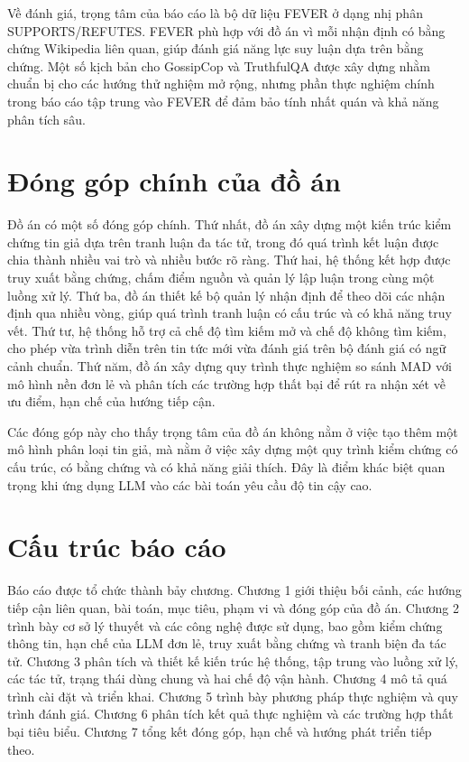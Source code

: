 ﻿\documentclass[oneside,a4paper,12pt]{extreport}
\begin{document}
Về đánh giá, trọng tâm của báo cáo là bộ dữ liệu FEVER ở dạng nhị phân SUPPORTS/REFUTES. FEVER phù hợp với đồ án vì mỗi nhận định có bằng chứng Wikipedia liên quan, giúp đánh giá năng lực suy luận dựa trên bằng chứng. Một số kịch bản cho GossipCop và TruthfulQA được xây dựng nhằm chuẩn bị cho các hướng thử nghiệm mở rộng, nhưng phần thực nghiệm chính trong báo cáo tập trung vào FEVER để đảm bảo tính nhất quán và khả năng phân tích sâu.

\section{Đóng góp chính của đồ án}

Đồ án có một số đóng góp chính. Thứ nhất, đồ án xây dựng một kiến trúc kiểm chứng tin giả dựa trên tranh luận đa tác tử, trong đó quá trình kết luận được chia thành nhiều vai trò và nhiều bước rõ ràng. Thứ hai, hệ thống kết hợp được truy xuất bằng chứng, chấm điểm nguồn và quản lý lập luận trong cùng một luồng xử lý. Thứ ba, đồ án thiết kế bộ quản lý nhận định để theo dõi các nhận định qua nhiều vòng, giúp quá trình tranh luận có cấu trúc và có khả năng truy vết. Thứ tư, hệ thống hỗ trợ cả chế độ tìm kiếm mở và chế độ không tìm kiếm, cho phép vừa trình diễn trên tin tức mới vừa đánh giá trên bộ đánh giá có ngữ cảnh chuẩn. Thứ năm, đồ án xây dựng quy trình thực nghiệm so sánh MAD với mô hình nền đơn lẻ và phân tích các trường hợp thất bại để rút ra nhận xét về ưu điểm, hạn chế của hướng tiếp cận.

Các đóng góp này cho thấy trọng tâm của đồ án không nằm ở việc tạo thêm một mô hình phân loại tin giả, mà nằm ở việc xây dựng một quy trình kiểm chứng có cấu trúc, có bằng chứng và có khả năng giải thích. Đây là điểm khác biệt quan trọng khi ứng dụng LLM vào các bài toán yêu cầu độ tin cậy cao.

\section{Cấu trúc báo cáo}

Báo cáo được tổ chức thành bảy chương. Chương 1 giới thiệu bối cảnh, các hướng tiếp cận liên quan, bài toán, mục tiêu, phạm vi và đóng góp của đồ án. Chương 2 trình bày cơ sở lý thuyết và các công nghệ được sử dụng, bao gồm kiểm chứng thông tin, hạn chế của LLM đơn lẻ, truy xuất bằng chứng và tranh biện đa tác tử. Chương 3 phân tích và thiết kế kiến trúc hệ thống, tập trung vào luồng xử lý, các tác tử, trạng thái dùng chung và hai chế độ vận hành. Chương 4 mô tả quá trình cài đặt và triển khai. Chương 5 trình bày phương pháp thực nghiệm và quy trình đánh giá. Chương 6 phân tích kết quả thực nghiệm và các trường hợp thất bại tiêu biểu. Chương 7 tổng kết đóng góp, hạn chế và hướng phát triển tiếp theo.
\end{document}
